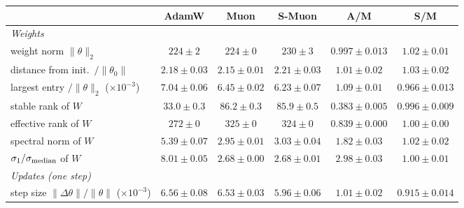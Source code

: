 \begin{center}\small\begin{minipage}{\linewidth}\centering
\captionsetup{type=table}
\caption{All metrics of Step 2 at training loss 1.81, which AdamW reaches near step 1450, Muon near step 860 and
smoothed Muon (S-Muon) near step 900: mean $\pm$ half-range over data orders 0--2, and the ratios AdamW/Muon (A/M) and
smoothed Muon/Muon (S/M). If one optimizer's values range over $[x_{\min},x_{\max}]$ and Muon's over
$[y_{\min},y_{\max}]$, the ratio ranges over $[x_{\min}/y_{\max},\,x_{\max}/y_{\min}]$, given as midpoint $\pm$
half-width. Rows marked ($\times10^k$) are in units of $10^k$. Bold: in each ratio column, among the ratios whose range
excludes 1, the five farthest from 1 on a log scale.}
\label{tab:app-am}
\footnotesize\setlength{\tabcolsep}{2.5pt}\setlength{\aboverulesep}{0pt}\setlength{\belowrulesep}{0pt}%
\renewcommand{\arraystretch}{1.15}%
\begin{tabular}{@{}l|ccc|cc@{}}
 & AdamW & Muon & S-Muon & A/M & S/M \\
\midrule
\emph{Weights} & & & & & \\
weight norm $\|\theta\|_2$ & $224 \pm 2$ & $224 \pm 0$ & $230 \pm 3$ & $0.997 \pm 0.013$ & $1.02 \pm 0.01$ \\
distance from init.\ $/\|\theta_0\|$ & $2.18 \pm 0.03$ & $2.15 \pm 0.01$ & $2.21 \pm 0.03$ & $1.01 \pm 0.02$ & $1.03 \pm 0.02$ \\
largest entry $/\|\theta\|_2$ ($\times10^{-3}$) & $7.04 \pm 0.06$ & $6.45 \pm 0.02$ & $6.23 \pm 0.07$ & $1.09 \pm 0.01$ & $0.966 \pm 0.013$ \\
stable rank of $W$ & $33.0 \pm 0.3$ & $86.2 \pm 0.3$ & $85.9 \pm 0.5$ & {\boldmath\textbf{$0.383 \pm 0.005$}} & $0.996 \pm 0.009$ \\
effective rank of $W$ & $272 \pm 0$ & $325 \pm 0$ & $324 \pm 0$ & $0.839 \pm 0.000$ & $1.00 \pm 0.00$ \\
spectral norm of $W$ & $5.39 \pm 0.07$ & $2.95 \pm 0.01$ & $3.03 \pm 0.04$ & $1.82 \pm 0.03$ & $1.02 \pm 0.02$ \\
$\sigma_1/\sigma_{\rm median}$ of $W$ & $8.01 \pm 0.05$ & $2.68 \pm 0.00$ & $2.68 \pm 0.01$ & {\boldmath\textbf{$2.98 \pm 0.03$}} & $1.00 \pm 0.01$ \\
\emph{Updates (one step)} & & & & & \\
step size $\|\Delta\theta\|/\|\theta\|$ ($\times10^{-3}$) & $6.56 \pm 0.08$ & $6.53 \pm 0.03$ & $5.96 \pm 0.06$ & $1.01 \pm 0.02$ & {\boldmath\textbf{$0.915 \pm 0.014$}} \\

\end{tabular}
\end{minipage}
\end{center}
